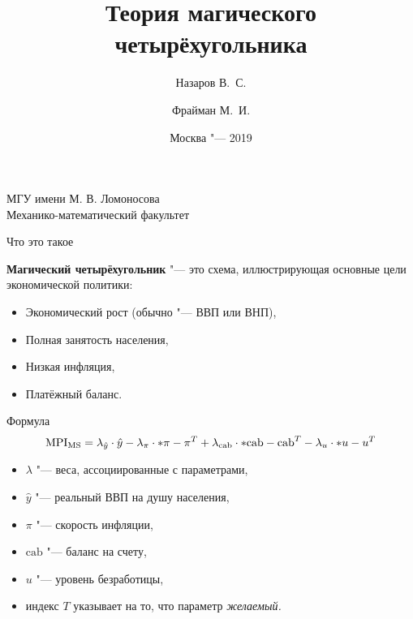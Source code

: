 \documentclass{beamer}
\let\abs\relax
\DeclarePairedDelimiter\abs{\lvert}{\rvert}
\begin{document}
\title{{Теория магического четырёхугольника}}
\author[%
	Назаров В.\ С. \and Фрайман М.\ И.
]{%
	\scriptsize
	Назаров В.\ С. \and Фрайман М.\ И.
}
\date{\footnotesize{Москва "--- 2019}}


	\begin{frame}
		\begin{center}
			\footnotesize{МГУ имени М. В. Ломоносова}\\
			\footnotesize{Механико-математический факультет}\\\vspace{10pt}
		\end{center}
		\titlepage
	\end{frame}

	\begin{frame}{Что это такое}
	
		\textbf{Магический четырёхугольник} "--- это схема, иллюстрирующая основные цели экономической политики:
		\begin{itemize}
			\item Экономический рост (обычно "--- ВВП или ВНП),
			\item Полная занятость населения,
			\item Низкая инфляция,
			\item Платёжный баланс.
		\end{itemize}
		
	\end{frame}
	
	\begin{frame}{Формула}
			\[
				\mathrm{MPI_{MS}} = \lambda_{\hat{y}}\cdot\hat{y} - 
									\lambda_\pi\cdot\abs*{\pi-\pi^T} +
									\lambda_{\mathrm{cab}}\cdot\abs*{{\mathrm{cab}}-{\mathrm{cab}}^T} -
									\lambda_u\cdot\abs*{u-u^T}
			\]
			
			\begin{itemize}
			\item $\lambda$ "--- веса, ассоциированные с параметрами,
			\item $\hat{y}$ "--- реальный ВВП на душу населения,
			\item $\pi$ "--- скорость инфляции,
			\item $\mathrm{cab}$ "--- баланс на счету,
			\item $u$ "--- уровень безработицы,
			\item индекс $T$ указывает на то, что параметр \textit{желаемый.}
			\end{itemize}
			
	\end{frame}
\end{document}
